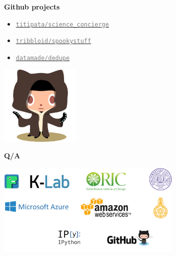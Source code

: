 \begin{frame}{\textbf{Github projects}}

\begin{itemize}
\item \href{https://github.com/titipata/science\_concierge}{\textcolor{gray}{\texttt{titipata/science\_concierge}}}
\item \href{https://github.com/tribbloid/spookystuff}{\textcolor{gray}{\texttt{tribbloid/spookystuff}}}
\item \href{https://github.com/datamade/dedupe}{\textcolor{gray}{\texttt{datamade/dedupe}}}
\end{itemize}

\begin{center}
\includegraphics[width=1.5in]{images/octobiwan}
\end{center}

\end{frame}


\begin{frame}

\begin{center}
\textbf{Q/A}
\end{center}

\begin{center}
\includegraphics[width=3.5in]{images/cover_back}
\end{center}

\end{frame}